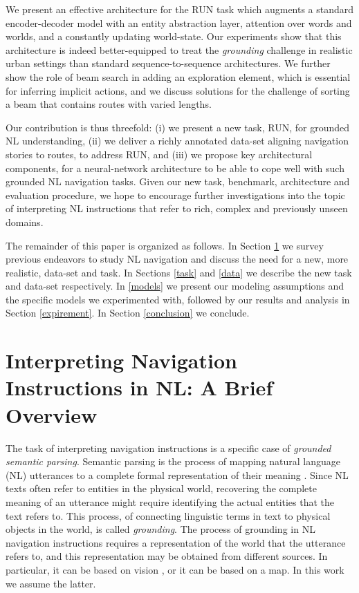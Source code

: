 \documentclass[11pt,a4paper]{article}
\begin{document}
We present an effective  architecture for the RUN task which augments a standard encoder-decoder model with an entity abstraction layer, attention over words and worlds, and a constantly updating world-state.
Our experiments show that this architecture is indeed better-equipped to treat the \textit{grounding} challenge in realistic urban settings than standard sequence-to-sequence architectures. We further show the role of beam search in adding an exploration element, which is essential for inferring implicit actions, and we discuss solutions for the challenge of sorting a beam that contains routes with varied lengths.

Our contribution is thus threefold: (i) we present a new task, RUN, for grounded NL understanding, (ii) we deliver a richly annotated data-set aligning navigation stories to routes, to address RUN,  and (iii) we propose key architectural components, for a neural-network architecture to be able to cope well with such grounded NL navigation tasks.
Given our new task,  benchmark,  architecture and evaluation procedure, we hope to encourage further investigations into the topic of interpreting NL instructions that refer to rich, complex and previously unseen domains.  

The remainder of this paper is organized as follows. In Section \ref{background} we survey previous endeavors to study NL navigation and discuss the need for a new, more realistic, data-set and task. In Sections \ref{task} and \ref{data}  we describe the new task and data-set respectively. In \ref{models} we present our modeling assumptions and the   specific models we experimented with, followed by our  results and analysis in Section \ref{expirement}. In Section \ref{conclusion} we conclude.


\section{Interpreting  Navigation Instructions in NL: A Brief   Overview}
\label{background}

The task of interpreting navigation instructions is a specific case of {\em grounded semantic parsing}. Semantic parsing is the process of mapping natural language (NL) utterances to a complete formal representation of their  meaning \cite{liang15,abend2017state}.
Since NL texts often refer to entities in the physical world,  recovering the complete meaning of an utterance  might require identifying the actual  entities   that the text refers to. This process, of connecting linguistic terms in text to physical objects in the world, is called \textit{grounding}. 
The process of grounding in NL navigation  instructions requires a representation of the world that the utterance refers to, and this representation   may be obtained from different sources. In particular, it can be based on vision \citep{anderson2017vision,blukis2018following,wang2018look}, or it can be based on a  map.  In this work we assume the latter.
\end{document}
